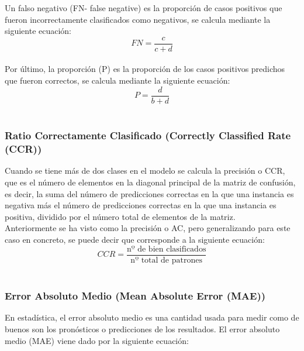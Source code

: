 		    Un falso negativo (FN- false negative) es la proporción de casos positivos que fueron incorrectamente clasificados como negativos, se calcula mediante la siguiente ecuación:\\

			\begin{equation}
				FN = \frac{c}{c+d}
				\label{FN}
			\end{equation}
			\\

			Por último, la proporción (P) es la proporción de los casos positivos predichos que fueron correctos, se calcula mediante la siguiente ecuación:\\

			\begin{equation}
				P = \frac{d}{b+d}
				\label{P}
			\end{equation}
			\\
		
			\subsubsection{Ratio Correctamente Clasificado (Correctly Classified Rate (CCR))}
			
			Cuando se tiene más de dos clases en el modelo se calcula la precisión o CCR, que es el número de elementos en la diagonal principal de la matriz de confusión, es decir, la suma del número de predicciones correctas en la que una instancia es negativa más el número de predicciones correctas en la que una instancia es positiva, dividido por el número total de elementos de la matriz.\\
			
			Anteriormente se ha visto como la precisión o AC, pero generalizando para este caso en concreto, se puede decir que corresponde a la siguiente ecuación:\\
			
			\begin{equation}
				CCR = \frac{\text{nº de bien clasificados}}{\text{nº total de patrones}}
				\label{CCR}
			\end{equation}
			\\
		
			\subsubsection{Error Absoluto Medio (Mean Absolute Error (MAE))}
			
			En estadística, el error absoluto medio es una cantidad usada para medir como de buenos son los pronósticos o predicciones de los resultados. El error absoluto medio (MAE) viene dado por la siguiente ecuación:
			
